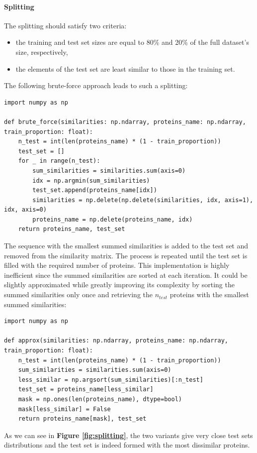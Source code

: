 \documentclass{article}
\begin{document}
\paragraph{Splitting}
The splitting should satisfy two criteria:
\begin{itemize}
    \item the training and test set sizes are equal to 80\% and 20\% of the full dataset's size, respectively,
    \item the elements of the test set are least similar to those in the training set.
\end{itemize}
The following brute-force approach leads to such a splitting:
\begin{lstlisting}
import numpy as np

def brute_force(similarities: np.ndarray, proteins_name: np.ndarray, train_proportion: float):
    n_test = int(len(proteins_name) * (1 - train_proportion))
    test_set = []
    for _ in range(n_test):
        sum_similarities = similarities.sum(axis=0)
        idx = np.argmin(sum_similarities)
        test_set.append(proteins_name[idx])
        similarities = np.delete(np.delete(similarities, idx, axis=1), idx, axis=0)
        proteins_name = np.delete(proteins_name, idx)
    return proteins_name, test_set
\end{lstlisting}
The sequence with the smallest summed similarities is added to the test set and removed from the similarity matrix. The process is repeated until the test set is filled with the required number of proteins. This implementation is highly inefficient since the summed similarities are sorted at each iteration. It could be slightly approximated while greatly improving its complexity by sorting the summed similarities only once and retrieving the $n_{test}$ proteins with the smallest summed similarities:
\begin{lstlisting}
import numpy as np

def approx(similarities: np.ndarray, proteins_name: np.ndarray, train_proportion: float):
    n_test = int(len(proteins_name) * (1 - train_proportion))
    sum_similarities = similarities.sum(axis=0)
    less_similar = np.argsort(sum_similarities)[:n_test]
    test_set = proteins_name[less_similar]
    mask = np.ones(len(proteins_name), dtype=bool)
    mask[less_similar] = False
    return proteins_name[mask], test_set
\end{lstlisting}
As we can see in \textbf{Figure \ref{fig:splitting}}, the two variants give very close test sets distributions and the test set is indeed formed with the most dissimilar proteins.
\end{document}
